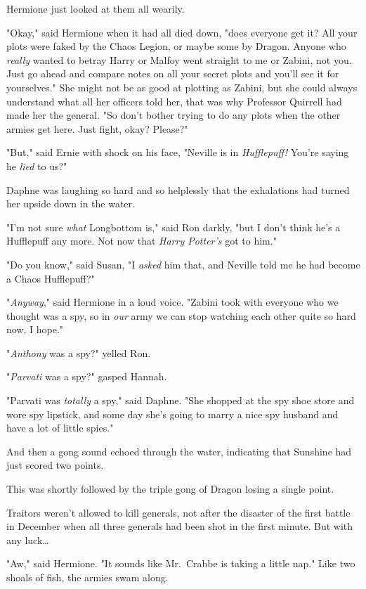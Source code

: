 Hermione just looked at them all wearily.

"Okay," said Hermione when it had all died down, "does everyone get it? All
your plots were faked by the Chaos Legion, or maybe some by Dragon. Anyone who
\emph{really} wanted to betray Harry or Malfoy went straight to me or Zabini,
not you. Just go ahead and compare notes on all your secret plots and you'll
see it for yourselves." She might not be as good at plotting as Zabini, but she
could always understand what all her officers told her, that was why Professor
Quirrell had made her the general. "So don't bother trying to do any plots when
the other armies get here. Just fight, okay? Please?"

"But," said Ernie with shock on his face, "Neville is in \emph{Hufflepuff!}
You're saying he \emph{lied} to us?"

Daphne was laughing so hard and so helplessly that the exhalations had turned
her upside down in the water.

"I'm not sure \emph{what} Longbottom is," said Ron darkly, "but I don't think
he's a Hufflepuff any more. Not now that \emph{Harry Potter's} got to him."

"Do you know," said Susan, "I \emph{asked} him that, and Neville told me he had
become a Chaos Hufflepuff?"

"\emph{Anyway}," said Hermione in a loud voice. "Zabini took with everyone who
we thought was a spy, so in \emph{our} army we can stop watching each other
quite so hard now, I hope."

"\emph{Anthony} was a spy?" yelled Ron.

"\emph{Parvati} was a spy?" gasped Hannah.

"Parvati was \emph{totally} a spy," said Daphne. "She shopped at the spy shoe
store and wore spy lipstick, and some day she's going to marry a nice spy
husband and have a lot of little spies."

And then a gong sound echoed through the water, indicating that Sunshine had
just scored two points.

This was shortly followed by the triple gong of Dragon losing a single point.

Traitors weren't allowed to kill generals, not after the disaster of the first
battle in December when all three generals had been shot in the first minute.
But with any luck{\ldots}

"Aw," said Hermione. "It sounds like Mr.~Crabbe is taking a little nap."
\later
Like two shoals of fish, the armies swam along.

